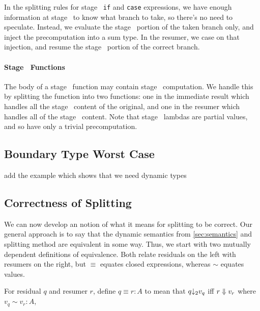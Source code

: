 In the splitting rules for stage \bbone\ {\tt if} and {\tt case} expressions, we
have enough information at stage \bbone\ to know what branch to take, so there's
no need to speculate. Instead, we evaluate the stage \bbone\ portion of the
taken branch only, and inject the precomputation into a sum type. In the
resumer, we case on that injection, and resume the stage \bbtwo\ portion of the
correct branch.

\paragraph {Stage \bbone\ Functions}

The body of a stage \bbone\ function may contain stage \bbtwo\ computation. We
handle this by splitting the function into two functions: one in the immediate
result which handles all the stage \bbone\ content of the original, and one in
the resumer which handles all of the stage \bbtwo\ content. Note that stage
\bbone\ lambdas are partial values, and so have only a trivial precomputation.

\subsection {Boundary Type Worst Case}

\TODO add the example which shows that we need dynamic types




\subsection{Correctness of Splitting}

We can now develop an notion of what it means for splitting to be correct.  
Our general approach is to say that the dynamic semantics from \ref{sec:semantics} and splitting method are equivalent in some way.  
Thus, we start with two mutually dependent definitions of equivalence.  
Both relate residuals on the left with resumers on the right,
but $\equiv$ equates closed expressions, whereas $\sim$ equates values.

\begin{definition}
For residual $q$ and resumer $r$, define $q \equiv r : A$ to mean that 
$q {\downarrow_{ 2}} v_q$ iff ${r} \Downarrow {v_r}$ where $v_q \sim v_r : A$, 
\end{definition}

